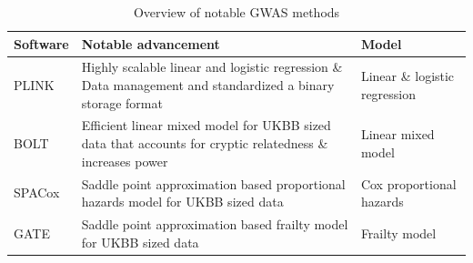 \begin{table}[h]
	\centering
	\begin{tabularx}{\textwidth}{l X l}
		\hline
		Software	&	Notable advancement		&	Model \\
		\hline
		PLINK\cite{chang2015second,purcell2007plink}	&
		Highly scalable linear and logistic regression \& Data management and standardized a binary storage format	&
		Linear \& logistic regression	\\
		BOLT\cite{loh2015efficient}	&
		Efficient linear mixed model for UKBB sized data that accounts for cryptic relatedness \& increases power	&
		Linear mixed model	\\
		SPACox\cite{bi2020fast}	&	
		Saddle point approximation based proportional hazards model for UKBB sized data &
		Cox proportional hazards \\
		GATE\cite{dey2022efficient}	&
		Saddle point approximation based frailty model for UKBB sized data	&
		Frailty model \\
		\hline
	\end{tabularx}
	\caption{Overview of notable GWAS methods}
	\label{table:GWASoverview}
\end{table}

